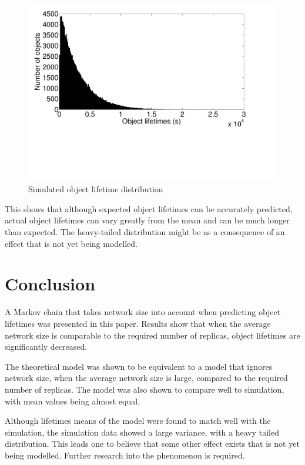 \documentclass[10pt,a4paper,conference]{IEEEtran}
\begin{document}
\begin{figure}[htbp]
 \centering
 \includegraphics[clip=true, viewport=0.5cm 6.0cm 26.0cm 20.5cm, width=0.8\columnwidth]{object_lifetimes}
 \caption{Simulated object lifetime distribution}
 \label{fig_object_lifetimes}
\end{figure}
%
This shows that although expected object lifetimes can be accurately predicted, actual object lifetimes can vary greatly from the mean and can be much longer than expected. The heavy-tailed distribution might be as a consequence of an effect that is not yet being modelled.

\section{Conclusion}
\label{conclusion}

A Markov chain that takes network size into account when predicting object lifetimes was presented in this paper. Results show that when the average network size is comparable to the required number of replicas, object lifetimes are significantly decreased.

The theoretical model was shown to be equivalent to a model that ignores network size, when the average network size is large, compared to the required number of replicas. The model was also shown to compare well to simulation, with mean values being almost equal.

Although lifetimes means of the model were found to match well with the simulation, the simulation data showed a large variance, with a heavy tailed distribution. This leads one to believe that some other effect exists that is not yet being modelled. Further research into the phenomenon is required.

\end{document}
